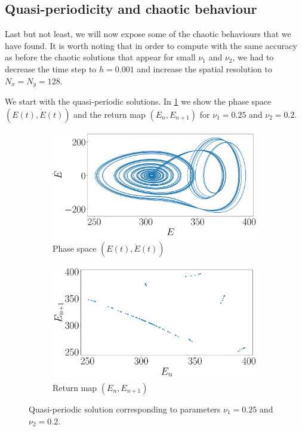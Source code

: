 \documentclass[twoside]{article}
\begin{document}
\subsection{Quasi-periodicity and chaotic behaviour}\label{sec:chaotic}
Last but not least, we will now expose some of the chaotic behaviours that we have found. It is worth noting that in order to compute with the same accuracy as before the chaotic solutions that appear for small $\nu_1$ and $\nu_2$, we had to decrease the time step to $h=0.001$ and increase the spatial resolution to $N_x=N_y=128$.

We start with the quasi-periodic solutions. In \cref{fig:qp} we show the phase space $(E(t), \dot{E}(t))$ and the return map $(E_n,E_{n+1})$ for $\nu_1=0.25$ and $\nu_2=0.2$.

\begin{figure}[ht]
  \centering
  \begin{subfigure}[ht]{0.45\textwidth}
    \includegraphics[width=\textwidth]{images/qp_phase.pdf}
    \caption{Phase space $(E(t), \dot{E}(t))$}
  \end{subfigure}\hspace{0.033333\textwidth}
  \begin{subfigure}[ht]{0.45\textwidth}
    \includegraphics[width=\textwidth]{images/qp_return.pdf}
    \caption{Return map $(E_n,E_{n+1})$}
  \end{subfigure}
  \caption{Quasi-periodic solution corresponding to parameters $\nu_1=0.25$ and $\nu_2=0.2$.}
  \label{fig:qp}
\end{figure}
\end{document}
